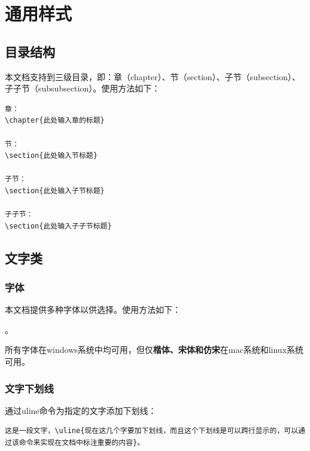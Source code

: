\chapter{通用样式}

\section{目录结构}

本文档支持到三级目录，即：章（chapter）、节（section）、子节（subsection）、子子节（subsubsection）。使用方法如下：

\begin{Verbatim}[]
章：
\chapter{此处输入章的标题}

节：
\section{此处输入节标题}

子节：
\section{此处输入子节标题}

子子节：
\section{此处输入子子节标题}
\end{Verbatim}

\section{文字类}
\subsection{字体}
本文档提供多种字体以供选择。使用方法如下：

。

所有字体在windows系统中均可用，但仅\textbf{楷体、宋体和仿宋}在mac系统和linux系统可用。

\subsection{文字下划线}
通过uline命令为指定的文字添加下划线：
\begin{Verbatim}[]
这是一段文字，\uline{现在这几个字要加下划线，而且这个下划线是可以跨行显示的，可以通过该命令来实现在文档中标注重要的内容}。
\end{Verbatim}

